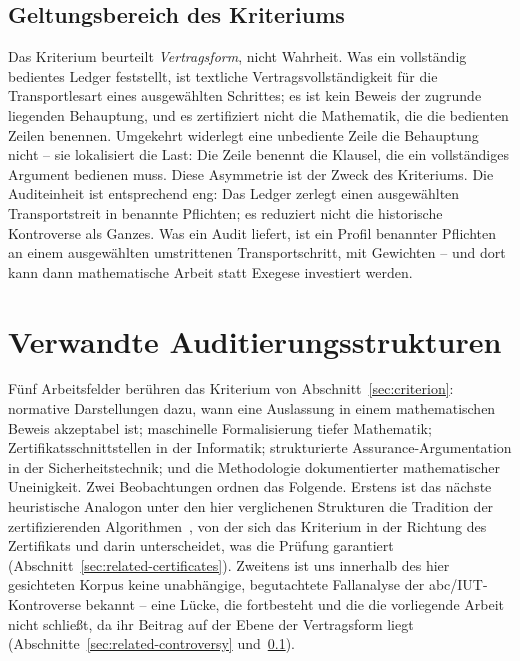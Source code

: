 \documentclass[11pt,a4paper]{article}
\begin{document}
\subsection{Geltungsbereich des Kriteriums}\label{sec:scope}

Das Kriterium beurteilt \emph{Vertragsform}, nicht Wahrheit. Was ein
vollständig bedientes Ledger feststellt, ist textliche Vertragsvollständigkeit
für die Transportlesart eines ausgewählten Schrittes; es ist kein Beweis der
zugrunde liegenden Behauptung, und es zertifiziert nicht die Mathematik, die
die bedienten Zeilen benennen. Umgekehrt widerlegt eine unbediente Zeile die
Behauptung nicht -- sie lokalisiert die Last: Die Zeile benennt die Klausel,
die ein vollständiges Argument bedienen muss. Diese Asymmetrie ist der Zweck
des Kriteriums. Die Auditeinheit ist entsprechend eng: Das Ledger zerlegt
einen ausgewählten Transportstreit in benannte Pflichten; es reduziert nicht
die historische Kontroverse als Ganzes. Was ein Audit liefert, ist ein Profil
benannter Pflichten an einem ausgewählten umstrittenen Transportschritt, mit
Gewichten -- und dort kann dann mathematische Arbeit statt Exegese
investiert werden.

\section{Verwandte Auditierungsstrukturen}\label{sec:related}

Fünf Arbeitsfelder berühren das Kriterium von Abschnitt~\ref{sec:criterion}:
normative Darstellungen dazu, wann eine Auslassung in einem mathematischen
Beweis akzeptabel ist; maschinelle Formalisierung tiefer Mathematik;
Zertifikatsschnittstellen in der Informatik; strukturierte
Assurance-Argumentation in der Sicherheitstechnik; und die Methodologie
dokumentierter mathematischer Uneinigkeit. Zwei Beobachtungen ordnen das
Folgende. Erstens ist das nächste heuristische Analogon unter den hier
verglichenen Strukturen die Tradition der zertifizierenden
Algorithmen~\cite{McConnell2011}, von der sich das Kriterium in der Richtung
des Zertifikats und darin unterscheidet, was die Prüfung garantiert
(Abschnitt~\ref{sec:related-certificates}). Zweitens ist uns innerhalb des
hier gesichteten Korpus keine unabhängige, begutachtete Fallanalyse der
abc/IUT-Kontroverse bekannt -- eine Lücke, die fortbesteht und die die
vorliegende Arbeit nicht schließt, da ihr Beitrag auf der Ebene der
Vertragsform liegt (Abschnitte~\ref{sec:related-controversy}
und~\ref{sec:scope}).
\end{document}

